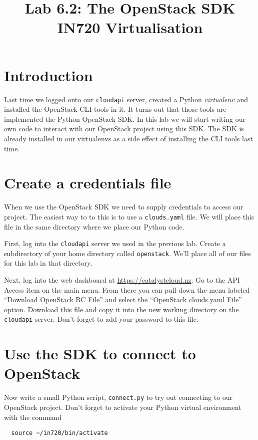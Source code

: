 \documentclass{article}
\begin{document}
\title{Lab 6.2: The OpenStack SDK \\ IN720 Virtualisation}
\date{}
\maketitle

\section*{Introduction}
Last time we logged onto our \texttt{cloudapi} server, created a Python \emph{virtualenv} and installed the OpenStack CLI tools in it. It turns out that those tools are implemented the Python OpenStack SDK. In this lab we will start writing our own code to interact with our OpenStack project using this SDK. The SDK is already installed in our virtualenvs as a side effect of installing the CLI tools last time.

\section{Create a credentials file}
When we use the OpenStack SDK we need to supply credentials to access our project. The easiest way to to this is to use a \texttt{clouds.yaml} file. We will place this file in the same directory where we place our Python code.

First, log into the \texttt{cloudapi} server we used in the previous lab. Create a subdirectory of your home directory called \texttt{openstack}. We'll place all of our files for this lab in that directory.

Next, log into the web dashboard at \url{https://catalystcloud.nz}. Go to the API Access item on the main menu. From there you can pull down the menu labeled ``Download OpenStack RC File'' and select the ``OpenStack clouds.yaml File'' option. Download this file and copy it into the new working directory on the \texttt{cloudapi} server. Don't forget to add your password to this file.

\section{Use the SDK to connect to OpenStack}
Now write a small Python script, \texttt{connect.py} to try out connecting to our OpenStack project. Don't forget to activate your Python virtual environment with the command

\begin{verbatim}
  source ~/in720/bin/activate
\end{verbatim}
\end{document}
